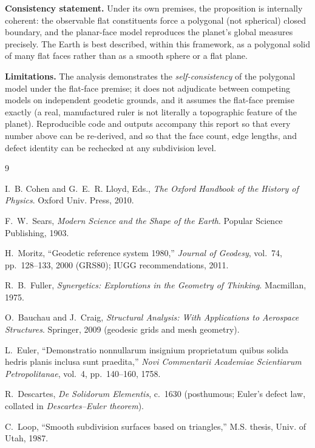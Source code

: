 \documentclass[11pt,a4paper]{article}
\begin{document}
\textbf{Consistency statement.} Under its own premises, the proposition is internally coherent: the observable flat constituents force a polygonal (not spherical) closed boundary, and the planar-face model reproduces the planet's global measures precisely. The Earth is best described, within this framework, as a polygonal solid of many flat faces rather than as a smooth sphere or a flat plane.

\textbf{Limitations.} The analysis demonstrates the \emph{self-consistency} of the polygonal model under the flat-face premise; it does not adjudicate between competing models on independent geodetic grounds, and it assumes the flat-face premise exactly (a real, manufactured ruler is not literally a topographic feature of the planet). Reproducible code and outputs accompany this report so that every number above can be re-derived, and so that the face count, edge lengths, and defect identity can be rechecked at any subdivision level.

\begin{thebibliography}{9}

I.~B. Cohen and G.~E.~R. Lloyd, Eds.,
\emph{The Oxford Handbook of the History of Physics}.
Oxford Univ. Press, 2010.

F.~W.~Sears,
\emph{Modern Science and the Shape of the Earth}.
Popular Science Publishing, 1903.

H.~Moritz,
``Geodetic reference system 1980,'' \emph{Journal of Geodesy}, vol.~74, pp.~128--133, 2000 (GRS80); IUGG recommendations, 2011.

R.~B.~Fuller,
\emph{Synergetics: Explorations in the Geometry of Thinking}.
Macmillan, 1975.

O.~Bauchau and J.~Craig,
\emph{Structural Analysis: With Applications to Aerospace Structures}.
Springer, 2009 (geodesic grids and mesh geometry).

L.~Euler,
``Demonstratio nonnullarum insignium proprietatum quibus solida hedris planis inclusa sunt praedita,'' \emph{Novi Commentarii Academiae Scientiarum Petropolitanae}, vol.~4, pp.~140--160, 1758.

R.~Descartes,
\emph{De Solidorum Elementis}, c.~1630 (posthumous; Euler's defect law, collated in \emph{Descartes--Euler theorem}).

C.~Loop,
``Smooth subdivision surfaces based on triangles,'' M.S. thesis, Univ. of Utah, 1987.

\end{thebibliography}
\end{document}
